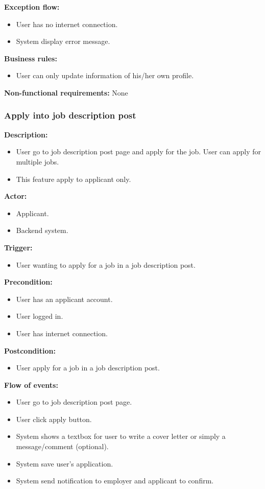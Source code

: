 \documentclass[a4paper]{article}
\begin{document}
\textbf{Exception flow:}
\begin{itemize}
  \item User has no internet connection.
  \item System display error message.
\end{itemize}

\textbf{Business rules:}
\begin{itemize}
  \item User can only update information of his/her own profile.
\end{itemize}

\textbf{Non-functional requirements:}
None

\subsubsection{Apply into job description post}
\textbf{Description:}
\begin{itemize}
  \item User go to job description post page and apply for the job. User can apply for multiple jobs.
  \item This feature apply to applicant only.
\end{itemize}

\textbf{Actor:}
\begin{itemize}
  \item Applicant.
  \item Backend system.
\end{itemize}

\textbf{Trigger:}
\begin{itemize}
  \item User wanting to apply for a job in a job description post.
\end{itemize}

\textbf{Precondition:}
\begin{itemize}
  \item User has an applicant account.
  \item User logged in.
  \item User has internet connection.
\end{itemize}

\textbf{Postcondition:}
\begin{itemize}
  \item User apply for a job in a job description post.
\end{itemize}

\textbf{Flow of events:}
\begin{itemize}
  \item User go to job description post page.
  \item User click apply button.
  \item System shows a textbox for user to write a cover letter or simply a message/comment (optional).
  \item System save user's application.
  \item System send notification to employer and applicant to confirm.
\end{itemize}
\end{document}
